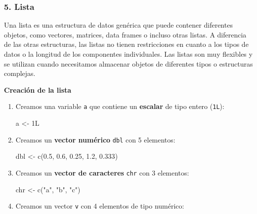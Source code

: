 \documentclass[
  jou,
  floatsintext,
  longtable,
  a4paper,
  nolmodern,
  notxfonts,
  notimes,
  12pt,
  colorlinks=true,linkcolor=blue,citecolor=blue,urlcolor=blue]{apa7}
\newenvironment{Shaded}{\begin{snugshade}}{\end{snugshade}}
\newcommand{\DecValTok}[1]{\textcolor[rgb]{0.68,0.00,0.00}{#1}}
\newcommand{\FloatTok}[1]{\textcolor[rgb]{0.68,0.00,0.00}{#1}}
\newcommand{\FunctionTok}[1]{\textcolor[rgb]{0.28,0.35,0.67}{#1}}
\newcommand{\NormalTok}[1]{\textcolor[rgb]{0.00,0.23,0.31}{#1}}
\newcommand{\OtherTok}[1]{\textcolor[rgb]{0.00,0.23,0.31}{#1}}
\newcommand{\StringTok}[1]{\textcolor[rgb]{0.13,0.47,0.30}{#1}}
\begin{document}
\subsubsection{5. Lista}\label{lista}

Una lista es una estructura de datos genérica que puede contener
diferentes objetos, como vectores, matrices, data frames o incluso otras
listas. A diferencia de las otras estructuras, las listas no tienen
restricciones en cuanto a los tipos de datos o la longitud de los
componentes individuales. Las listas son muy flexibles y se utilizan
cuando necesitamos almacenar objetos de diferentes tipos o estructuras
complejas.

\textbf{Creación de la lista}

\begin{enumerate}
\def\labelenumi{\arabic{enumi}.}
\item
  Creamos una variable \texttt{a} que contiene un \textbf{escalar} de
  tipo entero (\texttt{1L}):

\begin{Shaded}
\begin{Highlighting}[]
\NormalTok{a }\OtherTok{\textless{}{-}} \DecValTok{1}\NormalTok{L}
\end{Highlighting}
\end{Shaded}
\item
  Creamos un \textbf{vector numérico} \texttt{dbl} con 5 elementos:

\begin{Shaded}
\begin{Highlighting}[]
\NormalTok{dbl }\OtherTok{\textless{}{-}} \FunctionTok{c}\NormalTok{(}\FloatTok{0.5}\NormalTok{, }\FloatTok{0.6}\NormalTok{, }\FloatTok{0.25}\NormalTok{, }\FloatTok{1.2}\NormalTok{, }\FloatTok{0.333}\NormalTok{)}
\end{Highlighting}
\end{Shaded}
\item
  Creamos un \textbf{vector de caracteres} \texttt{chr} con 3 elementos:

\begin{Shaded}
\begin{Highlighting}[]
\NormalTok{chr }\OtherTok{\textless{}{-}} \FunctionTok{c}\NormalTok{(}\StringTok{"a"}\NormalTok{, }\StringTok{"b"}\NormalTok{, }\StringTok{"c"}\NormalTok{)}
\end{Highlighting}
\end{Shaded}
\item
  Creamos un vector \texttt{v} con 4 elementos de tipo numérico:


\end{enumerate}
\end{document}
